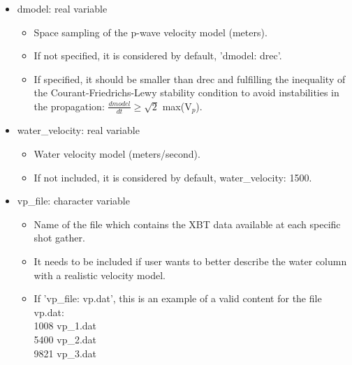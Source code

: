 \documentclass[11pt, oneside]{article}   	%
\begin{document}
\begin{itemize}
\item dmodel: real variable
\begin{itemize}
	\item Space sampling of the p-wave velocity model (meters). 
	\item If not specified, it is considered by default, 'dmodel: drec'.
	\item If specified, it should be smaller than drec and fulfilling the inequality of the Courant-Friedrichs-Lewy stability condition to avoid instabilities in the propagation: $\frac{dmodel}{dt} \ge  \sqrt{2}$ max(V$_p$).
	\end{itemize}

\item water\_velocity: real variable 
	\begin{itemize}
	\item Water velocity model (meters/second).
	\item If not included, it is considered by default, water\_velocity: 1500.
	\end{itemize}

\item vp\_file: character variable
	\begin{itemize}
	\item Name of the file which contains the XBT data available at each specific shot gather.
	\item It needs to be included if user wants to better describe the water column with a realistic velocity model.
	\item If 'vp\_file: vp.dat', this is an example of a valid content for the file vp.dat: \\
	
	1008 vp\_1.dat\\
	5400 vp\_2.dat\\
	9821 vp\_3.dat\\
	

\end{itemize}
\end{itemize}
\end{document}
